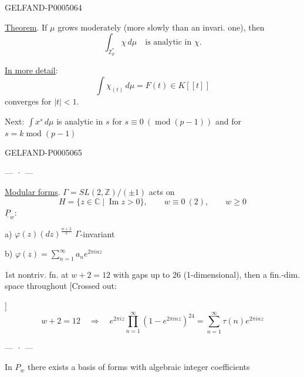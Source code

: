 \begin{GelfandAdjacentEvidence}{GELFAND-P000506}{4}


\uline{Theorem}. If $\mu$ grows moderately (more slowly than an invari. one), then
\[
\int_{\mathbb Z_p^*}\chi\,d\mu\quad\text{is analytic in $\chi$}.
\]

\uline{In more detail}:
\[
\int\chi_{(t)}\,d\mu=F(t)\in K[[t]]
\]
converges for $|t|<1$.

Next: $\int x^s\,d\mu$ is analytic in $s$ for $s\equiv0\ (\operatorname{mod}(p-1))$
and for $s=k\operatorname{mod}(p-1)$
\end{GelfandAdjacentEvidence}
\begin{GelfandAdjacentEvidence}{GELFAND-P000506}{5}


\begin{center}— · —\end{center}
\uline{Modular forms}. $\Gamma=SL(2,\mathbb Z)/(\pm1)$ acts on
\[
H=\{z\in\mathbb C\mid\operatorname{Im}z>0\},\qquad w\equiv0\ (2),\qquad w\geq0
\]
$\underline{P}_w$: 

a) $\varphi(z)(dz)^{\frac{w+2}{2}}$ $\Gamma$-invariant

b) $\varphi(z)=\displaystyle\sum_{n=1}^\infty a_ne^{2\pi inz}$

1st nontriv. fn. at $w+2=12$ with gaps up to $26$
(1-dimensional), then a fin.-dim. space throughout
[Crossed out: 
\end{GelfandAdjacentEvidence}
]
\[
w+2=12\quad\Longrightarrow\quad
e^{2\pi iz}\prod_{n=1}^\infty(1-e^{2\pi inz})^{24}
=\sum_{n=1}^\infty\tau(n)e^{2\pi inz}
\]
\begin{center}— · —\end{center}
In $P_w$ there exists a basis of forms with algebraic integer coefficients


